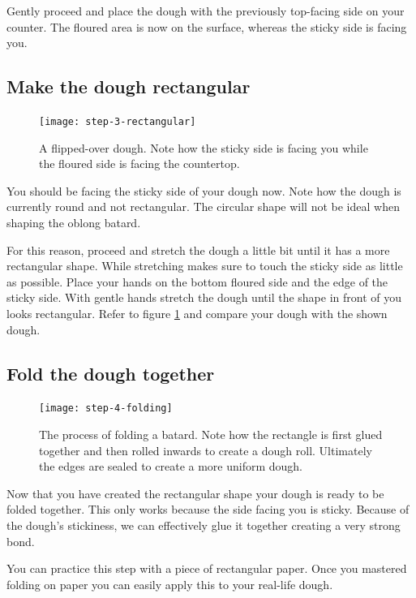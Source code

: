 Gently proceed and place the dough with the previously top-facing side
on your counter. The floured area is now on the surface, whereas the
sticky side is facing you.

\subsection[Create rectangular shape]{Make the dough rectangular}

\begin{figure}[htb!]
  \texttt{[image: step-3-rectangular]}
  \caption{A flipped-over dough. Note how the sticky side is facing
  you while the floured side is facing the countertop.}
  \label{fig:shaping-rectangular-dough}
\end{figure}

You should be facing the sticky side of your dough now. Note how
the dough is currently round and not rectangular. The circular
shape will not be ideal when shaping the oblong batard.

For this reason, proceed and stretch the dough a little bit until
it has a more rectangular shape. While stretching makes sure to touch
the sticky side as little as possible. Place your hands on the bottom
floured side and the edge of the sticky side. With gentle hands
stretch the dough until the shape in front of you looks rectangular.
Refer to figure \ref{fig:shaping-rectangular-dough} and compare
your dough with the shown dough.

\subsection[Folding]{Fold the dough together}

\begin{figure}[htb!]
  \texttt{[image: step-4-folding]}
  \caption{The process of folding a batard. Note how the rectangle is first glued
  together and then rolled inwards to create a dough roll. Ultimately the edges
  are sealed to create a more uniform dough.}
  \label{fig:shaping-folding}
\end{figure}

Now that you have created the rectangular shape your dough
is ready to be folded together. This only works because the side
facing you is sticky. Because of the dough's stickiness,
we can effectively glue it together creating a very
strong bond.

You can practice this step with a piece of rectangular paper.
Once you mastered folding on paper you can easily apply
this to your real-life dough.

